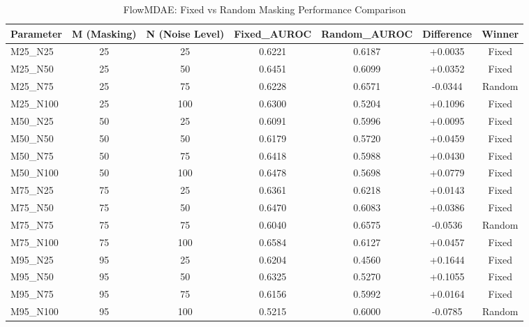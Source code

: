 \begin{table}
\caption{FlowMDAE: Fixed vs Random Masking Performance Comparison}
\label{tab:flowmdae_comparison}
\begin{tabular}{lcccccc}
\toprule
Parameter & M (Masking) & N (Noise Level) & Fixed_AUROC & Random_AUROC & Difference & Winner \\
\midrule
M25_N25 & 25 & 25 & 0.6221 & 0.6187 & +0.0035 & Fixed \\
M25_N50 & 25 & 50 & 0.6451 & 0.6099 & +0.0352 & Fixed \\
M25_N75 & 25 & 75 & 0.6228 & 0.6571 & -0.0344 & Random \\
M25_N100 & 25 & 100 & 0.6300 & 0.5204 & +0.1096 & Fixed \\
M50_N25 & 50 & 25 & 0.6091 & 0.5996 & +0.0095 & Fixed \\
M50_N50 & 50 & 50 & 0.6179 & 0.5720 & +0.0459 & Fixed \\
M50_N75 & 50 & 75 & 0.6418 & 0.5988 & +0.0430 & Fixed \\
M50_N100 & 50 & 100 & 0.6478 & 0.5698 & +0.0779 & Fixed \\
M75_N25 & 75 & 25 & 0.6361 & 0.6218 & +0.0143 & Fixed \\
M75_N50 & 75 & 50 & 0.6470 & 0.6083 & +0.0386 & Fixed \\
M75_N75 & 75 & 75 & 0.6040 & 0.6575 & -0.0536 & Random \\
M75_N100 & 75 & 100 & 0.6584 & 0.6127 & +0.0457 & Fixed \\
M95_N25 & 95 & 25 & 0.6204 & 0.4560 & +0.1644 & Fixed \\
M95_N50 & 95 & 50 & 0.6325 & 0.5270 & +0.1055 & Fixed \\
M95_N75 & 95 & 75 & 0.6156 & 0.5992 & +0.0164 & Fixed \\
M95_N100 & 95 & 100 & 0.5215 & 0.6000 & -0.0785 & Random \\
\bottomrule
\end{tabular}
\end{table}
